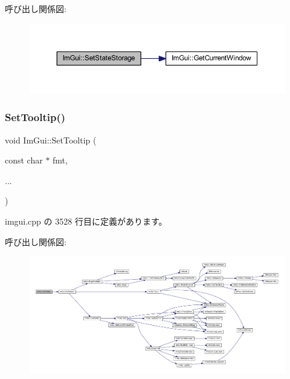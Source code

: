 呼び出し関係図\+:\nopagebreak
\begin{figure}[H]
\begin{center}
\leavevmode
\includegraphics[width=350pt]{namespace_im_gui_a635f4511603cc6284d8b21fb8d53090d_cgraph}
\end{center}
\end{figure}
\mbox{\label{namespace_im_gui_a313073fa01b8a9791f241ef93091ce92}} 
\subsubsection{\texorpdfstring{Set\+Tooltip()}{SetTooltip()}}
{\footnotesize\ttfamily void Im\+Gui\+::\+Set\+Tooltip (\begin{DoxyParamCaption}\item[{const char $\ast$}]{fmt,  }\item[{}]{... }\end{DoxyParamCaption})}



 imgui.\+cpp の 3528 行目に定義があります。

呼び出し関係図\+:\nopagebreak
\begin{figure}[H]
\begin{center}
\leavevmode
\includegraphics[width=350pt]{namespace_im_gui_a313073fa01b8a9791f241ef93091ce92_cgraph}
\end{center}
\end{figure}
\mbox{\label{namespace_im_gui_a3826acf68fc4a12bb66401575f51d6a2}} 
